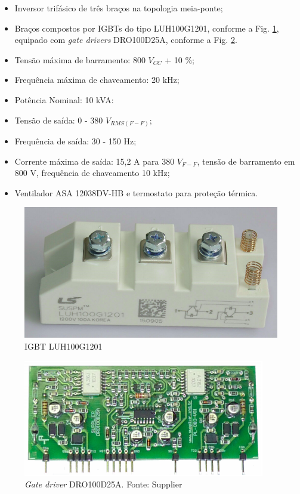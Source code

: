 \begin{itemize}
	\item Inversor trifásico de três braços na topologia meia-ponte;
	\item Braços compostos por IGBTs do tipo LUH100G1201, conforme a Fig. \ref{fig:igbt-LUH100G1201}, equipado com \textit{gate drivers} DRO100D25A, conforme a Fig. \ref{fig:driver-DRO100D25A}.
	\item Tensão máxima de barramento: 800 $V_{CC}$ + 10 \%;
	\item Frequência máxima de chaveamento: 20 kHz;
	\item Potência Nominal: 10 kVA:
	\item Tensão de saída: 0 - 380 $V_{RMS(F-F)}$;
	\item Frequência de saída: 30 - 150 Hz;
	\item Corrente máxima de saída: 15,2 A para 380 $V_{F-F}$, tensão de barramento em 800 V, frequência de chaveamento 10 kHz;
	\item Ventilador ASA 12038DV-HB e termostato para proteção térmica.
	
\end{itemize}

\begin{figure}[!hbt]
	\begin{center}
    \includegraphics[scale=0.3]{figuras/LUH100G1201.png}
    \caption{IGBT LUH100G1201}
    \label{fig:igbt-LUH100G1201}
    \end{center}
\end{figure}

\begin{figure}[!hbt]
	\begin{center}
    \includegraphics[scale=0.3]{figuras/driver_DRO100D25A.png}
    \caption{\textit{Gate driver} DRO100D25A. Fonte: Supplier}
    \label{fig:driver-DRO100D25A}
    \end{center}
\end{figure}

